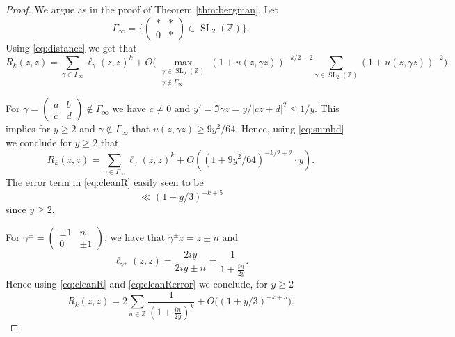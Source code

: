 \documentclass[12pt, a4paper]{amsart}
\newcommand{\tmop}[1]{\ensuremath{\operatorname{#1}}}
\theoremstyle{definition}
\newcommand {\1} {\mathbf{1}}
\numberwithin{equation}{section}
\begin{document}
\begin{proof}
We argue as in the proof of Theorem \ref{thm:bergman}. Let \[\Gamma_{\infty}= \bigg\{\begin{pmatrix}
\ast & \ast \\
0 &  \ast
\end{pmatrix} \in \tmop{SL}_2(\mathbb Z)
 \bigg\}.
\]
Using \eqref{eq:distance} we get that
\[
R_{k}(z,z)=\sum_{\gamma \in \Gamma_{\infty} } \ell_{\gamma}(z,z)^k
+O\bigg(\max_{\substack{\gamma \in \tmop{SL}_2(\mathbb Z) \\ \gamma \notin \Gamma_{\infty} }} (1+u(z,\gamma z))^{-k/2+2} \sum_{\gamma \in \tmop{SL}_2(\mathbb Z)}(1+u(z,\gamma z))^{-2} \bigg).
\]

For $\gamma =\begin{pmatrix}
a & b \\
c & d
\end{pmatrix}
\notin  \Gamma_{\infty} $ we have $c \neq 0$ and $y'=\Im \gamma z=y/|cz+d|^2 \le 1/y$. This implies for $y \ge 2$ and $\gamma \notin \Gamma_{\infty}$ that $u(z,\gamma z) \ge 9 y^2/64$. Hence, using \eqref{eq:sumbd} we conclude for $y \ge 2$ that
\begin{equation} \label{eq:cleanR}
R_{k}(z,z)=\sum_{\gamma \in \Gamma_{\infty} } \ell_{\gamma}(z,z)^k+O((1+9y^2/64)^{-k/2+2} \cdot y).
\end{equation}
The error term in \eqref{eq:cleanR} easily seen to be \begin{equation} \label{eq:cleanRerror}
\ll (1+y/3)^{-k+5}
\end{equation}
since $y \ge 2$.

For $\gamma^{\pm} =
\begin{pmatrix}
\pm 1 & n \\
 0 & \pm 1
\end{pmatrix}
$, we have that $\gamma^{\pm} z=z\pm n$ and
\[\ell_{ \gamma^{\pm}}( z,z)=\frac{2i y}{2iy \pm n}=\frac{1}{1\mp \frac{i n}{2y}}.\]
Hence using \eqref{eq:cleanR} and \eqref{eq:cleanRerror} we conclude, for $y \ge 2$
\begin{equation}  \label{eq:rclean2}
R_k(z,z)=2 \sum_{n \in \mathbb Z} \frac{1}{(1+\frac{i n}{2y})^k}+O\bigg( (1+y/3)^{-k+5} \bigg).
\end{equation}


\end{proof}
\end{document}
